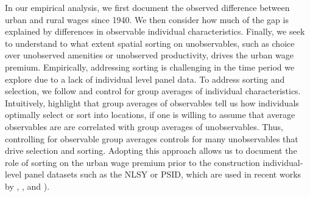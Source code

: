 \documentclass[12pt,twoside]{article}
\begin{document}
In our empirical analysis, we first document the observed difference between urban and rural wages since 1940.
We then consider how much of the gap is explained by differences in observable individual characteristics. 
Finally, we seek to understand to what extent spatial sorting on unobservables, such as choice over unobserved amenities or unobserved productivity, drives the urban wage premium. 
Empirically, addressing sorting is challenging in the time period we explore due to a lack of individual level panel data. 
To address sorting and selection, we follow \citet{altonji2018estimating} and control for group averages of individual characteristics.
Intuitively, \citet{altonji2018estimating} highlight that group averages of observables tell us how individuals optimally select or sort into locations, if one is willing to assume that average observables are are correlated with group averages of unobservables.
Thus, controlling for observable group averages controls for many unobservables that drive selection and sorting. 
Adopting this approach allows us to document the role of sorting on the urban wage premium prior to the construction individual-level panel datasets such as the NLSY or PSID, which are used in recent works by  \citet{Baum-Snow_Pavan_2012}, \citet{Glaeser_Mare_2001}, and \citet{Yankow_2006}). 
\end{document}
